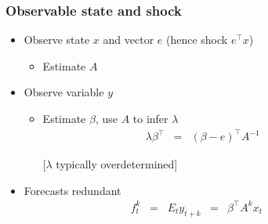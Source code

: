 \documentclass{beamer}
\begin{document}
\begin{frame}
\frametitle{Observable state and shock}
\begin{itemize}  \itemsep=\bigskipamount
\item Observe state $x$ and vector $e$ (hence shock $e^\top x$)\\
\begin{itemize}
\item Estimate $A$ %
\end{itemize}
\item Observe variable $y$ \\
\begin{itemize}
\item Estimate $\beta$, use $A$ to infer $\lambda$
\begin{eqnarray*}
    \lambda \beta^\top &=& (\beta - e)^\top A^{-1}
    \phantom{xxxxxx}
\end{eqnarray*}
\item[] [$\lambda$ typically overdetermined]
\end{itemize}
\item Forecasts redundant
\begin{eqnarray*}
    f^k_t \;\;=\;\; E_t y_{t+k} &=& \beta^\top A^k x_t \phantom{xxxxx}
\end{eqnarray*}
\end{itemize}
\end{frame}
\end{document}
